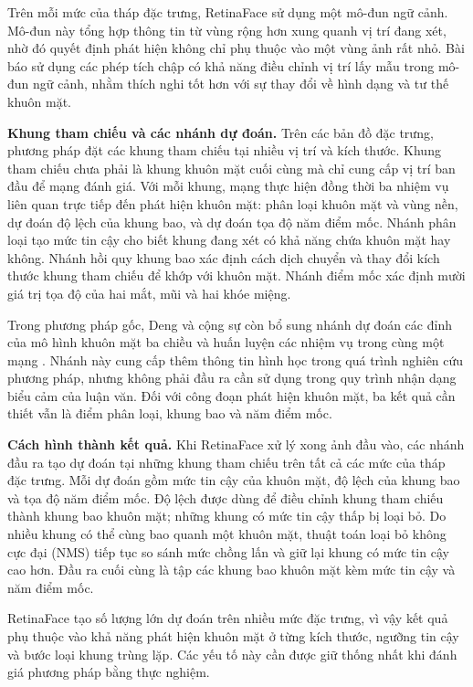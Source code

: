 \documentclass[../LuanVan.tex]{subfiles}
\begin{document}
Trên mỗi mức của tháp đặc trưng, RetinaFace sử dụng một mô-đun ngữ cảnh. Mô-đun này tổng hợp thông tin từ vùng rộng hơn xung quanh vị trí đang xét, nhờ đó quyết định phát hiện không chỉ phụ thuộc vào một vùng ảnh rất nhỏ. Bài báo sử dụng các phép tích chập có khả năng điều chỉnh vị trí lấy mẫu trong mô-đun ngữ cảnh, nhằm thích nghi tốt hơn với sự thay đổi về hình dạng và tư thế khuôn mặt.

\noindent\textbf{Khung tham chiếu và các nhánh dự đoán.} Trên các bản đồ đặc trưng, phương pháp đặt các khung tham chiếu tại nhiều vị trí và kích thước. Khung tham chiếu chưa phải là khung khuôn mặt cuối cùng mà chỉ cung cấp vị trí ban đầu để mạng đánh giá. Với mỗi khung, mạng thực hiện đồng thời ba nhiệm vụ liên quan trực tiếp đến phát hiện khuôn mặt: phân loại khuôn mặt và vùng nền, dự đoán độ lệch của khung bao, và dự đoán tọa độ năm điểm mốc. Nhánh phân loại tạo mức tin cậy cho biết khung đang xét có khả năng chứa khuôn mặt hay không. Nhánh hồi quy khung bao xác định cách dịch chuyển và thay đổi kích thước khung tham chiếu để khớp với khuôn mặt. Nhánh điểm mốc xác định mười giá trị tọa độ của hai mắt, mũi và hai khóe miệng.

Trong phương pháp gốc, Deng và cộng sự còn bổ sung nhánh dự đoán các đỉnh của mô hình khuôn mặt ba chiều và huấn luyện các nhiệm vụ trong cùng một mạng \cite{deng2020retinaface}. Nhánh này cung cấp thêm thông tin hình học trong quá trình nghiên cứu phương pháp, nhưng không phải đầu ra cần sử dụng trong quy trình nhận dạng biểu cảm của luận văn. Đối với công đoạn phát hiện khuôn mặt, ba kết quả cần thiết vẫn là điểm phân loại, khung bao và năm điểm mốc.

\noindent\textbf{Cách hình thành kết quả.} Khi RetinaFace xử lý xong ảnh đầu vào, các nhánh đầu ra tạo dự đoán tại những khung tham chiếu trên tất cả các mức của tháp đặc trưng. Mỗi dự đoán gồm mức tin cậy của khuôn mặt, độ lệch của khung bao và tọa độ năm điểm mốc. Độ lệch được dùng để điều chỉnh khung tham chiếu thành khung bao khuôn mặt; những khung có mức tin cậy thấp bị loại bỏ. Do nhiều khung có thể cùng bao quanh một khuôn mặt, thuật toán loại bỏ không cực đại (NMS) tiếp tục so sánh mức chồng lấn và giữ lại khung có mức tin cậy cao hơn. Đầu ra cuối cùng là tập các khung bao khuôn mặt kèm mức tin cậy và năm điểm mốc.

RetinaFace tạo số lượng lớn dự đoán trên nhiều mức đặc trưng, vì vậy kết quả phụ thuộc vào khả năng phát hiện khuôn mặt ở từng kích thước, ngưỡng tin cậy và bước loại khung trùng lặp. Các yếu tố này cần được giữ thống nhất khi đánh giá phương pháp bằng thực nghiệm.
\end{document}
